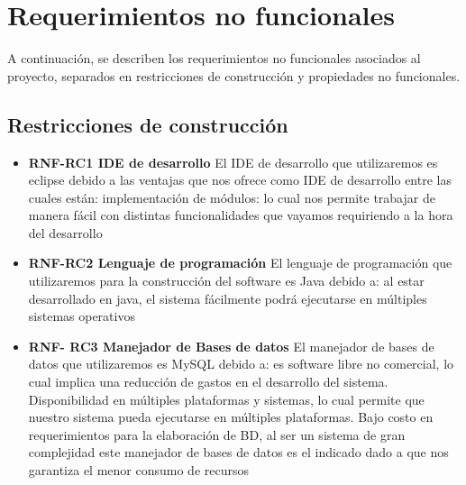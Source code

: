 \section{Requerimientos no funcionales}

	A continuación, se describen los requerimientos no funcionales asociados al proyecto, separados en restricciones de construcción y propiedades no funcionales.


\subsection{Restricciones de construcción}

\begin{itemize}
	\item \textbf{RNF-RC1 IDE de desarrollo} El IDE de desarrollo que utilizaremos es eclipse debido a las ventajas que nos ofrece como IDE de desarrollo entre las cuales están: implementación de módulos: lo cual nos permite trabajar de manera fácil con distintas funcionalidades que vayamos requiriendo a la hora del desarrollo
	\item \textbf{RNF-RC2 Lenguaje de programación} El lenguaje de programación que utilizaremos para la construcción del software es Java debido a: al estar desarrollado en java, el sistema fácilmente podrá ejecutarse en múltiples sistemas operativos
	\item \textbf{RNF-                                                                                                                                                                                                                                                                                                                                                                                                                                                                                                RC3 Manejador de Bases de datos} El manejador de bases de datos que utilizaremos es MySQL debido a: es software libre no comercial, lo cual implica una reducción de gastos en el desarrollo del sistema. Disponibilidad en múltiples plataformas y sistemas, lo cual permite que nuestro sistema pueda ejecutarse en múltiples plataformas. Bajo costo en requerimientos para la elaboración de BD, al ser un sistema de gran complejidad este manejador de bases de datos es el indicado dado a que nos garantiza el menor consumo de recursos
	
\end{itemize}

